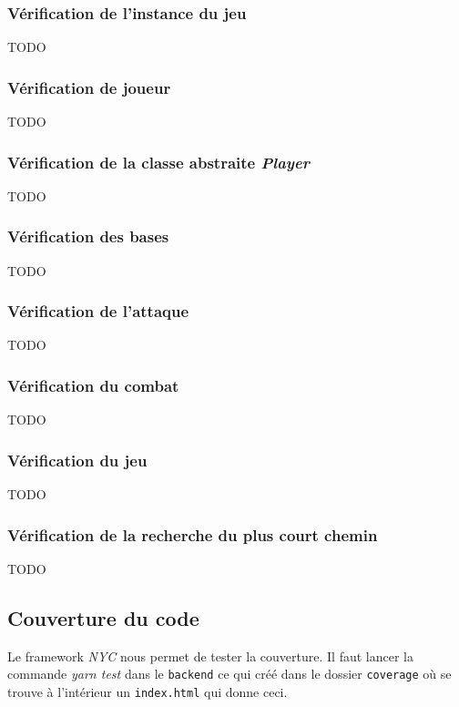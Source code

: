 \subsubsection{Vérification de l'instance du jeu}

TODO

\subsubsection{Vérification de joueur}

TODO

\subsubsection{Vérification de la classe abstraite \emph{Player}}

TODO

\subsubsection{Vérification des bases}

TODO

\subsubsection{Vérification de l'attaque}

TODO

\subsubsection{Vérification du combat}

TODO

\subsubsection{Vérification du jeu}

TODO

\subsubsection{Vérification de la recherche du plus court chemin}

TODO

\subsection{Couverture du code}

Le framework \emph{NYC} nous permet de tester la couverture. Il faut lancer la commande \emph{yarn test} dans le \lstinline{backend} ce qui créé dans le dossier \lstinline{coverage} où se trouve à l'intérieur un \lstinline{index.html} qui donne ceci.

